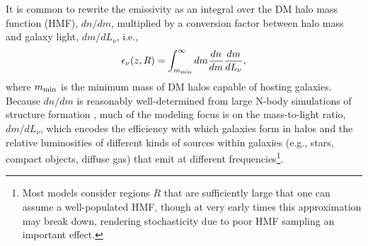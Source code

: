 It is common to rewrite the emissivity as an integral over the DM halo mass function (HMF), $dn/dm$, multiplied by a conversion factor between halo mass and galaxy light, $dm/dL_{\nu}$, i.e.,
\begin{equation}
	\epsilon_{\nu}(z,R) = \int_{m_{\text{min}}}^{\infty} dm \frac{dn}{dm} \frac{dm}{d L_{\nu}} ,
\end{equation}
where $m_{\text{min}}$ is the minimum mass of DM halos capable of hosting galaxies. Because $dn/dm$ is reasonably well-determined from large N-body simulations of structure formation \cite{PS1974,SMT2001,Tinker2010}, much of the modeling focus is on the mass-to-light ratio, $dm/dL_{\nu}$, which encodes the efficiency with which galaxies form in halos and the relative luminosities of different kinds of sources within galaxies (e.g., stars, compact objects, diffuse gas) that emit at different frequencies\footnote{Most models consider regions $R$ that are sufficiently large that one can assume a well-populated HMF, though at very early times this approximation may break down, rendering stochasticity due to poor HMF sampling an important effect.}. 

